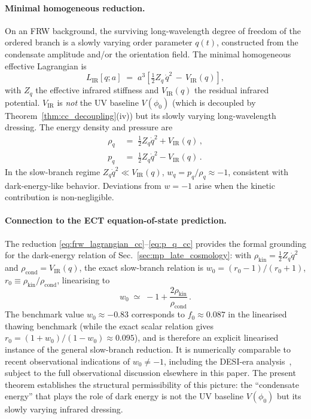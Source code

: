 \paragraph{Minimal homogeneous reduction.} On an FRW background, the
surviving long-wavelength degree of freedom of the ordered branch is a
slowly varying order parameter $q(t)$, constructed from the condensate
amplitude and/or the orientation field. The minimal homogeneous
effective Lagrangian is
\begin{equation}
L_{\mathrm{IR}}[q; a] \;=\; a^3 \left[ \tfrac{1}{2} Z_q\, \dot q^2
\,-\, V_{\mathrm{IR}}(q) \right],
\label{eq:frw_lagrangian_cc}
\end{equation}
with $Z_q$ the effective infrared stiffness and $V_{\mathrm{IR}}(q)$
the residual infrared potential. $V_{\mathrm{IR}}$ is \emph{not} the
UV baseline $V(\phi_0)$ (which is decoupled by Theorem~\ref{thm:cc_decoupling}(iv)) but its
slowly varying long-wavelength dressing. The energy density and
pressure are
\begin{align}
\rho_q &\;=\; \tfrac{1}{2} Z_q \dot q^2 + V_{\mathrm{IR}}(q)\,,
\label{eq:rho_q_cc} \\
p_q &\;=\; \tfrac{1}{2} Z_q \dot q^2 - V_{\mathrm{IR}}(q)\,.
\label{eq:p_q_cc}
\end{align}
In the slow-branch regime $Z_q \dot q^2 \ll V_{\mathrm{IR}}(q)$,
$w_q = p_q/\rho_q \approx -1$, consistent with dark-energy-like
behavior. Deviations from $w = -1$ arise when the kinetic contribution
is non-negligible.

\paragraph{Connection to the ECT equation-of-state prediction.} The
reduction
\eqref{eq:frw_lagrangian_cc}--\eqref{eq:p_q_cc} provides the formal
grounding for the dark-energy relation of
Sec.~\ref{sec:mp_late_cosmology}: with
$\rho_{\mathrm{kin}} = \tfrac12 Z_q \dot q^2$ and
$\rho_{\mathrm{cond}} = V_{\mathrm{IR}}(q)$, the exact slow-branch
relation is $w_0=(r_0-1)/(r_0+1)$,
$r_0\equiv\rho_{\mathrm{kin}}/\rho_{\mathrm{cond}}$, linearising to
\begin{equation}
w_0 \;\simeq\; -1 + \frac{2\rho_{\mathrm{kin}}}{\rho_{\mathrm{cond}}}\,.
\end{equation}
The benchmark value $w_0\approx-0.83$ corresponds to
$f_0\approx0.087$ in the linearised thawing benchmark (while the
exact scalar relation gives
$r_0=(1+w_0)/(1-w_0)\approx0.095$), and is therefore an explicit
linearised instance of the general
slow-branch reduction. It is numerically comparable to recent
observational indications of $w_0 \neq -1$, including the DESI-era
analysis~\cite{DESI2024}, subject to the full observational
discussion elsewhere in this paper. The present theorem establishes
the structural permissibility of this picture: the ``condensate
energy'' that plays the role of dark energy is not the UV baseline
$V(\phi_0)$ but its slowly varying infrared dressing.


